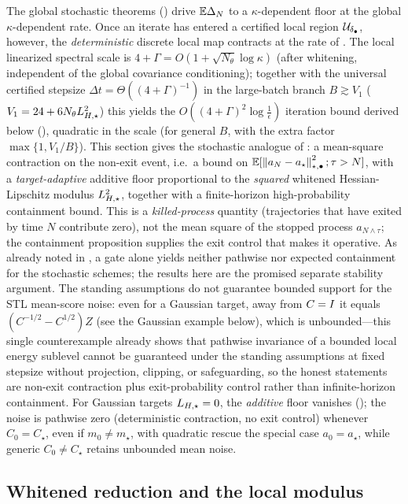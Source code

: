 The global stochastic theorems () drive $\mathbb{E}\Delta_N$ to a
$\kappa$-dependent floor at the global $\kappa$-dependent rate. Once an iterate has entered a
certified local region $\mathcal{U}_{\delta_\bullet}$, however, the \emph{deterministic} discrete local
map contracts at the rate of . The local linearized spectral scale is
$4+\Gamma=O(1+\sqrt{N_\theta}\log\kappa)$ (after whitening, independent of the global covariance
conditioning); together with the universal certified stepsize $\Delta t=\Theta((4+\Gamma)^{-1})$ in the
large-batch branch $B\gtrsim V_1$ ($V_1=24+6N_\theta L_{H,\star}^2$) this yields the
$O((4+\Gamma)^2\log\tfrac1\epsilon)$ iteration bound derived below (),
quadratic in the scale (for general $B$, with the extra factor $\max\{1,V_1/B\}$). This section gives the stochastic analogue of : a mean-square
contraction on the non-exit event, i.e.\ a bound on $\mathbb{E}[\left\lVert a_N-a_\star\right\rVert_{\star,\bullet}^2;\tau>N]$,
with a \emph{target-adaptive} additive floor proportional to the \emph{squared} whitened
Hessian-Lipschitz modulus $L_{H,\star}^2$, together with a finite-horizon high-probability containment bound. This is a
\emph{killed-process} quantity (trajectories that have exited by time $N$ contribute zero), not the
mean square of the stopped process $a_{N\wedge\tau}$; the containment proposition supplies the exit
control that makes it operative. As already noted in , a gate alone yields
neither pathwise nor expected containment for the stochastic schemes; the results here are the
promised separate stability argument. The standing assumptions do not guarantee bounded support for
the STL mean-score noise: even for a Gaussian target, away from $C=I$ it equals
$(C^{-1/2}-C^{1/2})Z$ (see the Gaussian example below), which is unbounded---this single counterexample
already shows that pathwise invariance of a bounded local energy sublevel cannot be guaranteed under
the standing assumptions at fixed stepsize without projection, clipping, or safeguarding, so the
honest statements are non-exit contraction plus exit-probability control rather than infinite-horizon
containment. For Gaussian targets $L_{H,\star}=0$, the
\emph{additive} floor vanishes (); the noise is pathwise zero (deterministic
contraction, no exit control) whenever $C_0=C_\star$, even if $m_0\neq m_\star$, with quadratic rescue
the special case $a_0=a_\star$, while generic $C_0\neq C_\star$ retains unbounded mean noise.

\subsection{Whitened reduction and the local modulus}
\label{subsec:local-whiten}


